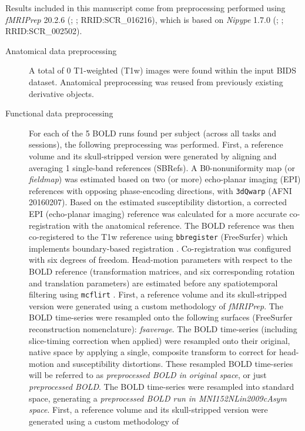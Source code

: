 \documentclass[]{article}
\date{}
\begin{document}
Results included in this manuscript come from preprocessing performed
using \emph{fMRIPrep} 20.2.6 (\citet{fmriprep1}; \citet{fmriprep2};
RRID:SCR\_016216), which is based on \emph{Nipype} 1.7.0
(\citet{nipype1}; \citet{nipype2}; RRID:SCR\_002502).

\begin{description}
\item[Anatomical data preprocessing]
A total of 0 T1-weighted (T1w) images were found within the input BIDS
dataset. Anatomical preprocessing was reused from previously existing
derivative objects.
\item[Functional data preprocessing]
For each of the 5 BOLD runs found per subject (across all tasks and
sessions), the following preprocessing was performed. First, a reference
volume and its skull-stripped version were generated by aligning and
averaging 1 single-band references (SBRefs). A B0-nonuniformity map (or
\emph{fieldmap}) was estimated based on two (or more) echo-planar
imaging (EPI) references with opposing phase-encoding directions, with
\texttt{3dQwarp} \citet{afni} (AFNI 20160207). Based on the estimated
susceptibility distortion, a corrected EPI (echo-planar imaging)
reference was calculated for a more accurate co-registration with the
anatomical reference. The BOLD reference was then co-registered to the
T1w reference using \texttt{bbregister} (FreeSurfer) which implements
boundary-based registration \citep{bbr}. Co-registration was configured
with six degrees of freedom. Head-motion parameters with respect to the
BOLD reference (transformation matrices, and six corresponding rotation
and translation parameters) are estimated before any spatiotemporal
filtering using \texttt{mcflirt} \citep[FSL 5.0.9,][]{mcflirt}. First, a
reference volume and its skull-stripped version were generated using a
custom methodology of \emph{fMRIPrep}. The BOLD time-series were
resampled onto the following surfaces (FreeSurfer reconstruction
nomenclature): \emph{fsaverage}. The BOLD time-series (including
slice-timing correction when applied) were resampled onto their
original, native space by applying a single, composite transform to
correct for head-motion and susceptibility distortions. These resampled
BOLD time-series will be referred to as \emph{preprocessed BOLD in
original space}, or just \emph{preprocessed BOLD}. The BOLD time-series
were resampled into standard space, generating a \emph{preprocessed BOLD
run in MNI152NLin2009cAsym space}. First, a reference volume and its
skull-stripped version were generated using a custom methodology of

\end{description}
\end{document}
